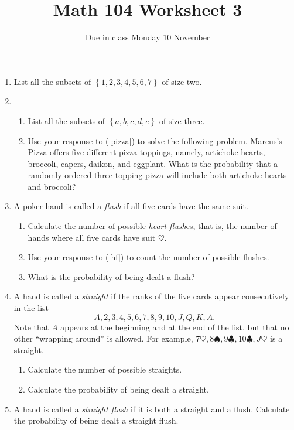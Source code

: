 \documentclass[12pt]{article}
\author{}\date{Due in class Monday 10 November}
\title{Math 104 Worksheet 3}\author{}
\begin{document}
\maketitle
\pagestyle{empty}
\begin{enumerate}
\item List all the subsets of $\left\{1,2,3,4,5,6,7\right\}$
of size two.
\item\begin{enumerate}
\item\label{pizza}
List all the subsets of $\left\{a,b,c,d,e\right\}$ of size three.
\item Use your response to (\ref{pizza}) to solve the following problem.
Marcus's Pizza offers five different pizza toppings,
namely, artichoke hearts, broccoli, capers, daikon, and eggplant.
What is the probability that a randomly ordered three-topping pizza
will include both artichoke hearts and broccoli?
\end{enumerate}
\item A poker hand is called a {\em flush} if all five cards
have the same suit.
\begin{enumerate}
\item\label{hf} Calculate the number of possible {\em heart flush}es,
that is, the number of hands where all five cards have suit $\heartsuit$.
\item Use your response to (\ref{hf}) to count the number of
possible flushes.
\item What is the probability of being dealt a flush?
\end{enumerate}
\item A hand is called a {\em straight} if the ranks of the five
cards appear consecutively in the list
\[A,2,3,4,5,6,7,8,9,10,J,Q,K,A.\]
Note that $A$ appears at the beginning and at the end of the list, but
that no other ``wrapping around'' is allowed.
For example, $7\heartsuit,8\spadesuit,9\clubsuit,10\clubsuit,J\heartsuit$
is a straight.
\begin{enumerate}
\item Calculate the number of possible straights.
\item Calculate the probability of being dealt a straight.
\end{enumerate}
\item A hand is called a {\em straight flush} if it is both
a straight and a flush. Calculate the probability of being dealt
a straight flush.
\end{enumerate}
\end{document}

